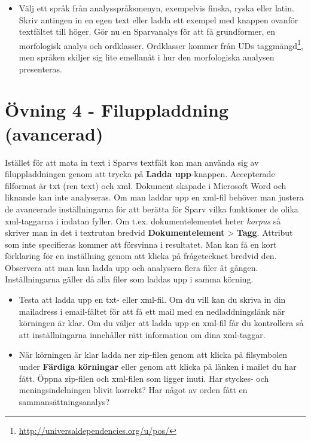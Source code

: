 \documentclass[paper=a4, fontsize=12pt]{scrartcl} %
\numberwithin{equation}{section} %
\numberwithin{figure}{section} %
\numberwithin{table}{section} %
\begin{document}
\begin{itemize}
    \item [\textbf{3.1}]
        Välj ett språk från analysspråksmenyn, exempelvis finska, ryska eller latin.
        Skriv antingen in en egen text eller ladda ett exempel med
        knappen ovanför textfältet till höger.
        Gör nu en Sparvanalys för att få grundformer,
        en morfologisk analys och ordklasser. Ordklasser kommer
        från UDs taggmängd\footnote{\url{http://universaldependencies.org/u/pos/}}, men språken skiljer sig lite emellanåt
        i hur den morfologiska analysen presenteras.
\end{itemize}

\pagebreak

\section*{Övning 4 - Filuppladdning (avancerad)}
Istället för att mata in text i Sparvs textfält kan man använda sig av filuppladdningen
genom att trycka på \textbf{Ladda upp}-knappen. Accepterade filformat är txt (ren text) och xml.
Dokument skapade i Microsoft Word och liknande kan inte analyseras.
Om man laddar upp en xml-fil behöver man justera de avancerade inställningarna för att berätta
för Sparv vilka funktioner de olika xml-taggarna i indatan fyller. Om t.ex. dokumentelementet heter \emph{korpus}
så skriver man in det i textrutan bredvid \textbf{Dokumentelement} > \textbf{Tagg}. Attribut som inte
specifieras kommer att försvinna i resultatet. Man kan få en kort förklaring för en inställning
genom att klicka på frågetecknet bredvid den.
Observera att man kan ladda upp och analysera flera filer åt gången.
Inställningarna gäller då alla filer som laddas upp i samma körning.

\begin{itemize}
    \item [\textbf{4.1}]
		Testa att ladda upp en txt- eller xml-fil. Om du vill kan du skriva in din mailadress
		i email-fältet för att få ett mail med en nedladdningslänk när körningen är klar.
		Om du väljer att ladda upp en xml-fil får du kontrollera så att inställningarna
		innehåller rätt information om dina xml-taggar.
	\item [\textbf{4.2}]
		När körningen är klar ladda ner zip-filen genom att klicka på filsymbolen under
		\textbf{Färdiga körningar} eller genom att klicka på länken i mailet du har fått.
		Öppna zip-filen och xml-filen som ligger inuti. Har styckes- och meningsindelningen
		blivit korrekt? Har något av orden fått en sammansättningsanalys?
\end{itemize}
\end{document}
